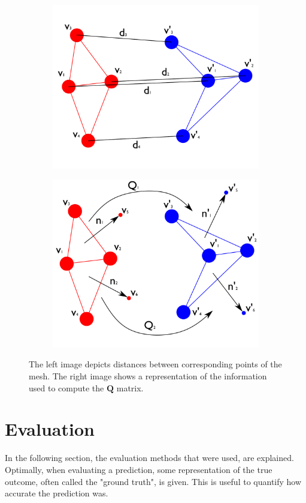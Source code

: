 \begin{figure}
\centering
\begin{subfigure}{.5\textwidth}
  \centering
  \includegraphics[width=.75\linewidth]{figures/pediag}
\end{subfigure}%
\begin{subfigure}{.5\textwidth}
  \centering
  \includegraphics[width=.75\linewidth]{figures/dediag}
\end{subfigure}
\caption[Error metric diagrams]{The left image depicts distances between corresponding points of the mesh. The right image shows a representation of the information used to compute the $\mathbf{Q}$ matrix.}
\label{fig:errordiag}
\end{figure}

\section{Evaluation}
In the following section, the evaluation methods that were used, are explained. Optimally, when evaluating a prediction, some representation of the true outcome, often called the "ground truth", is given. This is useful to quantify how accurate the prediction was.
